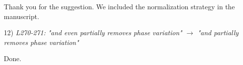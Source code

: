 \documentclass[a4paper,11pt,twoside]{report}
\begin{document}
\begin{enumerate}
    \hspace{1em} {\color{blue} Thank you for the suggestion.
    We included the normalization strategy in the manuscript.}

    \item [12)] \textit{L270-271: "and even partially removes phase variation" $\rightarrow$ "and partially removes phase variation"}

    \hspace{1em} {\color{blue} Done.}

\end{enumerate}
\end{document}

